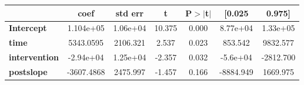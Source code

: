 \begin{center}
\begin{tabular}{lcccccc}
\toprule
                      & \textbf{coef} & \textbf{std err} & \textbf{t} & \textbf{P$> |$t$|$} & \textbf{[0.025} & \textbf{0.975]}  \\
\midrule
\textbf{Intercept}    &    1.104e+05  &     1.06e+04     &    10.375  &         0.000        &     8.77e+04    &     1.33e+05     \\
\textbf{time}         &    5343.0595  &     2106.321     &     2.537  &         0.023        &      853.542    &     9832.577     \\
\textbf{intervention} &    -2.94e+04  &     1.25e+04     &    -2.357  &         0.032        &     -5.6e+04    &    -2812.700     \\
\textbf{postslope}    &   -3607.4868  &     2475.997     &    -1.457  &         0.166        &    -8884.949    &     1669.975     \\
\bottomrule
\end{tabular}
\end{center}